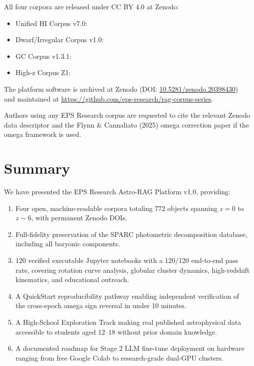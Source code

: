 \documentclass[twocolumn]{aastex631}
\begin{document}
All four corpora are released under CC BY 4.0 at Zenodo:

\begin{itemize}
\item Unified HI Corpus v7.0: 
\item Dwarf/Irregular Corpus v1.0: 
\item GC Corpus v1.3.1: 
\item High-z Corpus Z1: 
\end{itemize}

The platform software is archived at Zenodo
(DOI: \href{https://doi.org/10.5281/zenodo.20398430}{10.5281/zenodo.20398430})
and maintained at \url{https://github.com/eps-research/rag-corpus-series}.

Authors using any EPS Research corpus are requested to cite the relevant
Zenodo data descriptor and the Flynn \& Cannaliato (2025) omega correction
paper \citep{flynn2025} if the omega framework is used.

\section{Summary}
\label{sec:summary}

We have presented the EPS Research Astro-RAG Platform v1.0, providing:

\begin{enumerate}
\item Four open, machine-readable corpora totaling 772 objects spanning
      $z = 0$ to $z \sim 6$, with permanent Zenodo DOIs.
\item Full-fidelity preservation of the SPARC photometric decomposition
      database, including all baryonic components.
\item 120 verified executable Jupyter notebooks with a 120/120 end-to-end
      pass rate, covering rotation curve analysis, globular cluster dynamics,
      high-redshift kinematics, and educational outreach.
\item A QuickStart reproducibility pathway enabling independent verification
      of the cross-epoch omega sign reversal in under 10 minutes.
\item A High-School Exploration Track making real published astrophysical
      data accessible to students aged 12--18 without prior domain knowledge.
\item A documented roadmap for Stage 2 LLM fine-tune deployment on hardware
      ranging from free Google Colab to research-grade dual-GPU clusters.
\end{enumerate}
\end{document}
